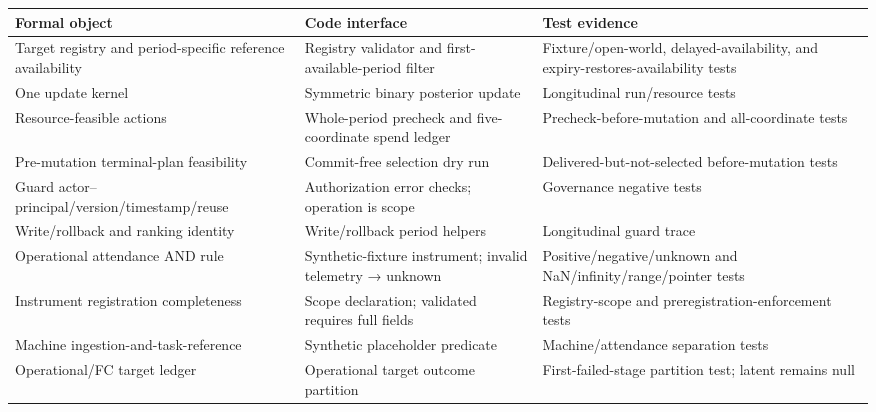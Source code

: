 \documentclass[
  11pt]{article}
\begin{document}
\begin{longtable}[]{@{}
  >{\raggedright\arraybackslash}p{}
  >{\raggedright\arraybackslash}p{}
  >{\raggedright\arraybackslash}p{}@{}}
\toprule\noalign{}
\begin{minipage}[b]{\linewidth}\raggedright
Formal object
\end{minipage} & \begin{minipage}[b]{\linewidth}\raggedright
Code interface
\end{minipage} & \begin{minipage}[b]{\linewidth}\raggedright
Test evidence
\end{minipage} \\
\midrule\noalign{}
\endhead
\bottomrule\noalign{}
\endlastfoot
Target registry and period-specific reference availability & Registry
validator and first-available-period filter & Fixture/open-world,
delayed-availability, and expiry-restores-availability tests \\
One update kernel & Symmetric binary posterior update & Longitudinal
run/resource tests \\
Resource-feasible actions & Whole-period precheck and five-coordinate
spend ledger & Precheck-before-mutation and all-coordinate tests \\
Pre-mutation terminal-plan feasibility & Commit-free selection dry run &
Delivered-but-not-selected before-mutation tests \\
Guard actor--principal/version/timestamp/reuse & Authorization error
checks; operation is scope & Governance negative tests \\
Write/rollback and ranking identity & Write/rollback period helpers &
Longitudinal guard trace \\
Operational attendance AND rule & Synthetic-fixture instrument; invalid
telemetry → unknown & Positive/negative/unknown and
NaN/infinity/range/pointer tests \\
Instrument registration completeness & Scope declaration; validated
requires full fields & Registry-scope and preregistration-enforcement
tests \\
Machine ingestion-and-task-reference & Synthetic placeholder predicate &
Machine/attendance separation tests \\
Operational/FC target ledger & Operational target outcome partition &
First-failed-stage partition test; latent remains null \\

\end{longtable}
\end{document}
